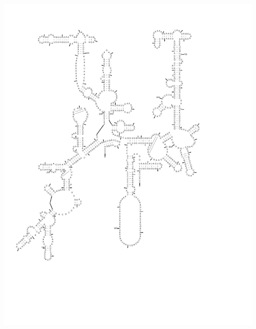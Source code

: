 \begin{center}
\newpage
\includegraphics[height=8.5in]{../../seeds/ss-diagrams/metamito-0p1}

\end{center}

